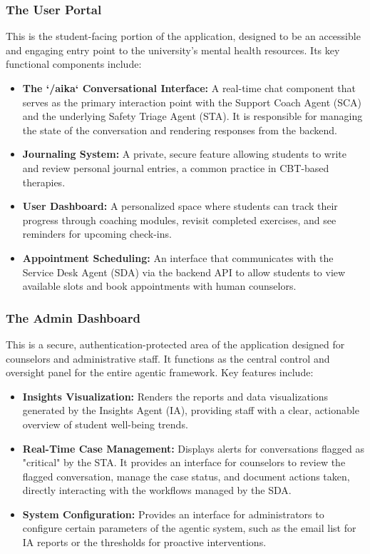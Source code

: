 \subsubsection{The User Portal}
This is the student-facing portion of the application, designed to be an accessible and engaging entry point to the university's mental health resources. Its key functional components include:
\begin{itemize}
    \item \textbf{The `/aika` Conversational Interface:} A real-time chat component that serves as the primary interaction point with the Support Coach Agent (SCA) and the underlying Safety Triage Agent (STA). It is responsible for managing the state of the conversation and rendering responses from the backend.
    \item \textbf{Journaling System:} A private, secure feature allowing students to write and review personal journal entries, a common practice in CBT-based therapies.
    \item \textbf{User Dashboard:} A personalized space where students can track their progress through coaching modules, revisit completed exercises, and see reminders for upcoming check-ins.
    \item \textbf{Appointment Scheduling:} An interface that communicates with the Service Desk Agent (SDA) via the backend API to allow students to view available slots and book appointments with human counselors.
\end{itemize}

\subsubsection{The Admin Dashboard}
This is a secure, authentication-protected area of the application designed for counselors and administrative staff. It functions as the central control and oversight panel for the entire agentic framework. Key features include:
\begin{itemize}
    \item \textbf{Insights Visualization:} Renders the reports and data visualizations generated by the Insights Agent (IA), providing staff with a clear, actionable overview of student well-being trends.
    \item \textbf{Real-Time Case Management:} Displays alerts for conversations flagged as "critical" by the STA. It provides an interface for counselors to review the flagged conversation, manage the case status, and document actions taken, directly interacting with the workflows managed by the SDA.
    \item \textbf{System Configuration:} Provides an interface for administrators to configure certain parameters of the agentic system, such as the email list for IA reports or the thresholds for proactive interventions.
\end{itemize}


